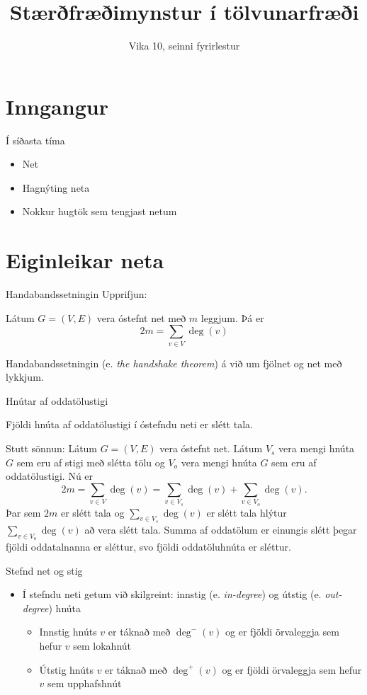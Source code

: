 \documentclass{beamer}
\title{Stærðfræðimynstur í tölvunarfræði}
\subtitle{Vika 10, seinni fyrirlestur}
\begin{document}
\begin{frame}
\titlepage
\end{frame}


\section{Inngangur}

\begin{frame}{Í síðasta tíma}
\begin{itemize}
 \item Net
 \item Hagnýting neta
 \item Nokkur hugtök sem tengjast netum
\end{itemize}
\end{frame}

\section{Eiginleikar neta}

\begin{frame}{Handabandssetningin}
Upprifjun:
\begin{tcolorbox}[title=Handabandssetningin]
Látum $G = (V, E)$ vera óstefnt net með $m$ leggjum. Þá er
\[
 2m = \sum_{v \in V} \deg(v)
\]
\end{tcolorbox}
Handabandssetningin (e. \emph{the handshake theorem}) á við um fjölnet og net með lykkjum.
\end{frame}

\begin{frame}{Hnútar af oddatölustigi}
\begin{tcolorbox}
Fjöldi hnúta af oddatölustigi í óstefndu neti er slétt tala.
\end{tcolorbox}

Stutt sönnun: Látum $G = (V,E)$ vera óstefnt net. Látum $V_s$ vera mengi hnúta $G$ sem eru af stigi með slétta tölu og $V_o$ vera mengi hnúta $G$ sem eru af oddatölustigi. Nú er
\[
 2m = \sum_{v \in V} \deg(v) = \sum_{v \in V_s} \deg(v) + \sum_{v \in V_o} \deg(v).
\]
Þar sem $2m$ er slétt tala og $\sum_{v \in V_s} \deg(v)$ er slétt tala hlýtur $\sum_{v \in V_o} \deg(v)$ að vera slétt tala. Summa af oddatölum er einungis slétt þegar fjöldi oddatalnanna er sléttur, svo fjöldi oddatöluhnúta er sléttur.
\end{frame}

\begin{frame}{Stefnd net og stig}
\begin{itemize}
 \item Í stefndu neti getum við skilgreint: innstig (e. \emph{in-degree}) og útstig (e. \emph{out-degree}) hnúta
 \begin{itemize}
  \item Innstig hnúts $v$ er táknað með $\deg^-(v)$ og er fjöldi örvaleggja sem hefur $v$ sem lokahnút
  \item Útstig hnúts $v$ er táknað með $\deg^+(v)$ og er fjöldi örvaleggja sem hefur $v$ sem upphafshnút
 \end{itemize}
\end{itemize}
\end{frame}
\end{document}
